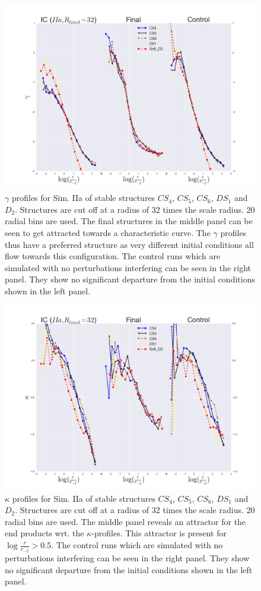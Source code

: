 \begin{figure}[!htbp]
\centering
\includegraphics[width=1.0 cm]{img/log_r_r2_gamma_CS4CS5CS6DS1D2_Rlimit32.png}
\caption{$\gamma$ profiles for Sim. IIa of stable structures $CS_4$, $CS_5$, $CS_6$, $DS_1$ and $D_2$.
Structures are cut off at a radius of 32 times the scale radius. 20 radial bins are used. 
The final structures in the middle panel can be seen to get attracted towards a characteristic curve.
The $\gamma$ profiles thus have a preferred structure as very different initial conditions all flow towards this configuration.
The control runs which are simulated with no perturbations interfering can be seen in the right panel.
They show no significant departure from the initial conditions shown in the left panel.}
\label{fig:test}
\end{figure}

\begin{figure}[!htbp]
\centering
\includegraphics[width=1.0 cm]{img/log_r_r2_kappa_CS4CS5CS6DS1D2_Rlimit32.png}
\caption{$\kappa$ profiles for Sim. IIa of stable structures $CS_4$, $CS_5$, $CS_6$, $DS_1$ and $D_2$.
Structures are cut off at a radius of 32 times the scale radius. 20 radial bins are used. 
The middle panel reveals an attractor for the end products wrt. the $\kappa$-profiles.
This attractor is present for $\log \frac{r}{r_{-2}} > 0.5$. 
The control runs which are simulated with no perturbations interfering can be seen in the right panel.
They show no significant departure from the initial conditions shown in the left panel.}
\label{fig:test}
\end{figure}

